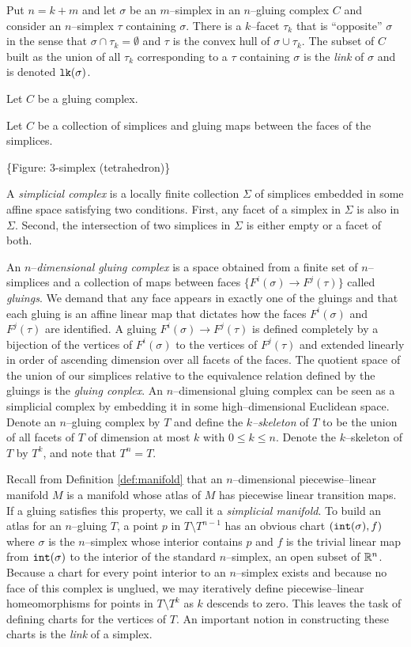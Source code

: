 Put $n=k+m$ and let $\sigma$ be an $m$--simplex in an $n$--gluing complex $C$ and consider an $n$--simplex $\tau$ containing $\sigma$.
There is a $k$--facet $\tau_k$ that is ``opposite'' $\sigma$ in the sense that $\sigma\cap\tau_k=\emptyset$ and $\tau$ is the convex hull of $\sigma\cup\tau_k$.
The subset of $C$ built as the union of all $\tau_k$ corresponding to a $\tau$ containing $\sigma$ is the \emph{link} of $\sigma$ and is denoted $\texttt{lk}(\sigma)$.

Let $C$ be a gluing complex.



Let $C$ be a collection of simplices and gluing maps between the faces of the simplices.

\{Figure: 3-simplex (tetrahedron)\}

A \emph{simplicial complex} is a locally finite collection $\Sigma$ of simplices embedded in some affine space satisfying two conditions.
First, any facet of a simplex in $\Sigma$ is also in $\Sigma$.
Second, the intersection of two simplices in $\Sigma$ is either empty or a facet of both.

An $n$--\emph{dimensional gluing complex} is a space obtained from a finite set of $n$--simplices and a collection of maps between faces $\{F^i(\sigma)\to F^j(\tau)\}$ called \emph{gluings}.
We demand that any face appears in exactly one of the gluings and that each gluing is an affine linear map that dictates how the faces $F^i(\sigma)$ and $F^j(\tau)$ are identified.
A gluing $F^i(\sigma)\to F^j(\tau)$ is defined completely by a bijection of the vertices of $F^i(\sigma)$ to the vertices of $F^j(\tau)$ and extended linearly in order of ascending dimension over all facets of the faces.
The quotient space of the union of our simplices relative to the equivalence relation defined by the gluings is the \emph{gluing conplex}.
An $n$--dimensional gluing complex can be seen as a simplicial complex by embedding it in some high--dimensional Euclidean space.
Denote an $n$--gluing complex by $T$ and define the \emph{$k$--skeleton} of $T$ to be the union of all facets of $T$ of dimension at most $k$ with $0\leq k\leq n$.
Denote the $k$--skeleton of $T$ by $T^k$, and note that $T^n=T$.




Recall from Definition \ref{def:manifold} that an $n$--dimensional piecewise--linear manifold $M$ is a manifold whose atlas of $M$ has piecewise linear transition maps.
If a gluing satisfies this property, we call it a \emph{simplicial manifold}.
To build an atlas for an $n$--gluing $T$, a point $p$ in $T\setminus T^{n-1}$ has an obvious chart $(\mathtt{int}(\sigma),f)$ where $\sigma$ is the $n$--simplex whose interior contains $p$ and $f$ is the trivial linear map from $\mathtt{int}(\sigma)$ to the interior of the standard $n$--simplex, an open subset of $\mathbb{R}^n$.
Because a chart for every point interior to an $n$--simplex exists and because no face of this complex is unglued, we may iteratively define piecewise--linear homeomorphisms for points in $T\setminus T^{k}$ as $k$ descends to zero.
This leaves the task of defining charts for the vertices of $T$.
An important notion in constructing these charts is the \emph{link} of a simplex.


